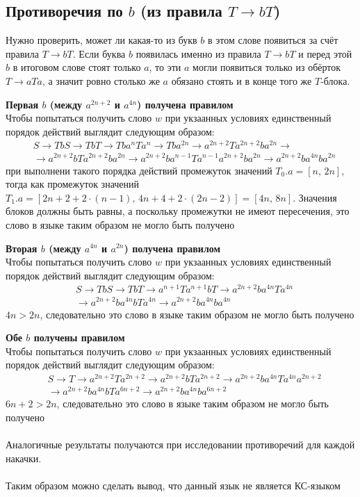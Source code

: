 \documentclass[12pt,a4paper]{article}
\begin{document}
\subsection*{Противоречия по $b$ (из правила $T \to bT$)} 
Нужно проверить, может ли какая-то из букв $b$ в этом слове появиться за счёт правила $T \to bT$.
Если буква $b$ появилась именно из правила $T \to bT$ и перед этой $b$ в итоговом слове стоят только $a$, то эти $a$ могли появиться только из обёрток $T \to aTa$, а значит ровно столько же $a$ обязано стоять и в конце того же $T$-блока.

\textbf{Первая $b$ (между $a^{2n+2}$ и $a^{4n}$) получена правилом}\\
Чтобы попытаться получить слово $w$ при укзаанных условиях единственный порядок действий выглядит следующим образом:
\[
\begin{aligned}
& S \to TbS \to TbT \to Tba^nTa^n \to Tba^{2n} \to a^{2n+2}Ta^{2n+2}ba^{2n} \to \\
& \to a^{2n+2}bTa^{2n+2}ba^{2n} \to a^{2n+2}ba^{n-1}Ta^{n-1}a^{2n+2}ba^{2n} \to a^{2n+2}ba^{4n}ba^{2n}
\end{aligned}
\]
при выполнени такого порядка действий промежуток значений $T_0.a = [n,\, 2n]$, тогда как промежуток значений $T_1.a = [2n+2+2\cdot(n-1),\, 4n+4+2\cdot(2n-2)] = [4n,\, 8n]$. Значения блоков должны быть равны, а поскольку промежутки не имеют пересечения, это слово в языке таким образом не могло быть получено

\textbf{Вторая $b$ (между $a^{4n}$ и $a^{2n}$) получена правилом}\\
Чтобы попытаться получить слово $w$ при укзаанных условиях единственный порядок действий выглядит следующим образом:
\[
\begin{aligned}
& S \to TbS \to TbT \to a^{n+1}Ta^{n+1}bT \to a^{2n+2}ba^{4n}Ta^{4n} \\
& \to a^{2n+2}ba^{4n}bTa^{4n} \to a^{2n+2}ba^{4n}ba^{4n}
\end{aligned}
\]
$4n>2n$, следовательно это слово в языке таким образом не могло быть получено

\textbf{Обе $b$ получены правилом}\\
Чтобы попытаться получить слово $w$ при укзаанных условиях единственный порядок действий выглядит следующим образом:
\[
\begin{aligned}
& S \to T \to a^{2n+2}Ta^{2n+2} \to a^{2n+2}bTa^{2n+2} \to a^{2n+2}ba^{4n}Ta^{4n}a^{2n+2} \\
& \to a^{2n+2}ba^{4n}bTa^{6n+2} \to a^{2n+2}ba^{4n}ba^{6n+2}
\end{aligned}
\]
$6n+2>2n$, следовательно это слово в языке таким образом не могло быть получено\\
\\
Аналогичные результаты получаются при исследовании противоречий для каждой накачки.\\
\\
Таким образом можно сделать вывод, что данный язык не является КС-языком
\end{document}
